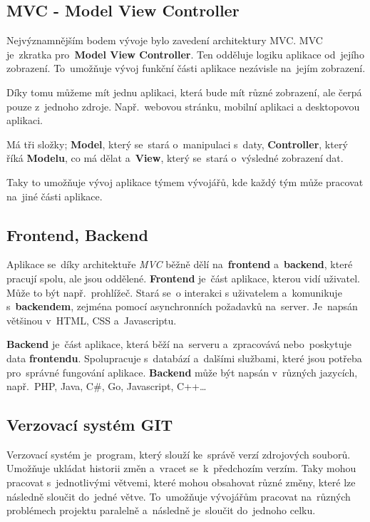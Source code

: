 \documentclass[14pt]{article}
\begin{document}
        
        \subsection{MVC - Model View Controller}
        Nejvýznamnějším bodem vývoje bylo zavedení architektury MVC. MVC je~zkratka pro~\textbf{Model View Controller}.
        Ten odděluje logiku aplikace od~jejího zobrazení. To~umožňuje vývoj funkční části aplikace nezávisle na~jejím zobrazení.

        Díky tomu můžeme mít jednu aplikaci, která bude mít různé zobrazení, ale čerpá pouze z~jednoho zdroje. Např.~webovou stránku, mobilní aplikaci a desktopovou aplikaci.

        Má tři složky; \textbf{Model}, který se~stará o~manipulaci s~daty, \textbf{Controller}, který říká \textbf{Modelu}, co má dělat
        a~\textbf{View}, který se~stará o~výsledné zobrazení dat.

        Taky to umožňuje vývoj aplikace týmem vývojářů, kde každý tým může pracovat na~jiné části aplikace.

        \subsection{Frontend, Backend}
        Aplikace se~díky architektuře \emph{MVC} běžně dělí na~\textbf{frontend} a~\textbf{backend}, které pracují spolu, ale jsou oddělené.
        \textbf{Frontend} je~část aplikace, kterou vidí uživatel. Může to být např.~prohlížeč. Stará se~o interakci s uživatelem a~komunikuje s~\textbf{backendem},
        zejména pomocí asynchronních požadavků na~server. Je~napsán většinou v~HTML, CSS a~Javascriptu.

        \textbf{Backend} je~část aplikace, která běží na~serveru a~zpracovává nebo~poskytuje data \textbf{frontendu}.
        Spolupracuje s~databází a~dalšími službami, které jsou potřeba pro~správné fungování aplikace.
        \textbf{Backend} může být napsán v~různých jazycích, např.~PHP, Java, C\#, Go, Javascript, C++\dots


        \subsection{Verzovací systém GIT}
        Verzovací systém je~program, který slouží ke~správě verzí zdrojových souborů.
        Umožňuje ukládat historii změn a~vracet se~k~předchozím verzím. Taky mohou pracovat s~jednotlivými větvemi,
        které mohou obsahovat různé změny, které lze následně sloučit do~jedné větve.
        To~umožňuje vývojářům pracovat na~různých problémech projektu paralelně a~následně je~sloučit do~jednoho celku.
\end{document}
